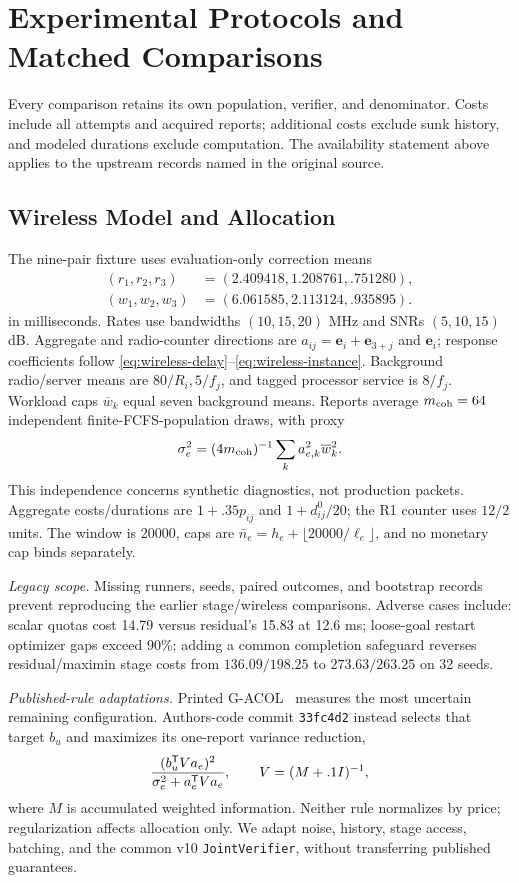 \section{Experimental Protocols and Matched Comparisons}
\label{app:experiments}
Every comparison retains its own population, verifier, and denominator. Costs include all attempts and acquired reports; additional costs exclude sunk history, and modeled durations exclude computation. The availability statement above applies to the upstream records named in the original source.

\subsection{Wireless Model and Allocation}
\label{app:wireless-parameters}
The nine-pair fixture uses evaluation-only correction means
$$
\begin{aligned}
(r_1,r_2,r_3)&=(2.409418,1.208761,.751280),\\
(w_1,w_2,w_3)&=(6.061585,2.113124,.935895).
\end{aligned}
$$
in milliseconds. Rates use bandwidths $(10,15,20)$ MHz and SNRs $(5,10,15)$ dB. Aggregate and radio-counter directions are $a_{ij}=\mathbf e_i+\mathbf e_{3+j}$ and $\mathbf e_i$; response coefficients follow \eqref{eq:wireless-delay}--\eqref{eq:wireless-instance}. Background radio/server means are $80/R_i,5/f_j$, and tagged processor service is $8/f_j$. Workload caps $\overline w_k$ equal seven background means. Reports average $m_{\rm coh}=64$ independent finite-FCFS-population draws, with proxy
$$\sigma_e^2=(4m_{\rm coh})^{-1}\sum_k a_{e,k}^2\overline w_k^2.$$
This independence concerns synthetic diagnostics, not production packets. Aggregate costs/durations are $1+.35p_{ij}$ and $1+d_{ij}^0/20$; the R1 counter uses $12/2$ units. The window is 20000, caps are $\bar n_e=h_e+\lfloor20000/\ell_e\rfloor$, and no monetary cap binds separately.

\label{app:restored-comparisons}
\emph{Legacy scope.} Missing runners, seeds, paired outcomes, and bootstrap records prevent reproducing the earlier stage/wireless comparisons. Adverse cases include: scalar quotas cost 14.79 versus residual's 15.83 at 12.6 ms; loose-goal restart optimizer gaps exceed 90\%; adding a common completion safeguard reverses residual/maximin stage costs from $136.09/198.25$ to $273.63/263.25$ on 32 seeds. 

\label{app:allocation-replication}
\emph{Published-rule adaptations.} Printed G-ACOL~\cite{lindner2022} measures the most uncertain remaining configuration. Authors-code commit \texttt{33fc4d2} instead selects that target $b_u$ and maximizes its one-report variance reduction,
$$\frac{(b_u^{\mathsf{T}}Va_e)^2}{\sigma_e^2+a_e^{\mathsf{T}}Va_e},\qquad V=(M+.1I)^{-1},$$
where $M$ is accumulated weighted information. Neither rule normalizes by price; regularization affects allocation only. We adapt noise, history, stage access, batching, and the common v10 \texttt{JointVerifier}, without transferring published guarantees.

